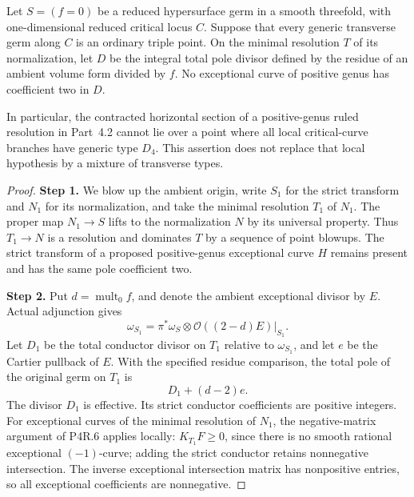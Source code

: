 \begin{proposition}[P4.39]
Let $S=(f=0)$ be a reduced hypersurface germ in a smooth
threefold, with one-dimensional reduced critical locus $C$.
Suppose that every generic transverse germ along $C$ is an
ordinary triple point. On the minimal resolution $T$ of its
normalization, let $D$ be the integral total pole divisor
defined by the residue of an ambient volume form divided by
$f$. No exceptional curve of positive genus has coefficient
two in $D$.

In particular, the contracted horizontal section of a
positive-genus ruled resolution in Part~4.2 cannot lie over
a point where all local critical-curve branches have generic
type $D_4$. This assertion does not replace that local
hypothesis by a mixture of transverse types.
\end{proposition}
\begin{proof}
\noindent\textbf{Step 1.} We blow up the ambient origin, write $S_1$ for the strict
transform and $N_1$ for its normalization, and take the
minimal resolution $T_1$ of $N_1$. The proper map $N_1\to S$
lifts to the normalization $N$ by its universal property.
Thus $T_1\to N$ is a resolution and dominates $T$ by a
sequence of point blowups. The strict transform of a proposed
positive-genus exceptional curve $H$ remains present and has
the same pole coefficient two.

\noindent\textbf{Step 2.} Put $d=\operatorname{mult}_0f$, and denote the ambient
exceptional divisor by $E$. Actual adjunction gives
\[
 \omega_{S_1}=\pi^*\omega_S\otimes
        \mathcal O((2-d)E)|_{S_1}.
\]
Let $D_1$ be the total conductor divisor on $T_1$ relative
to $\omega_{S_1}$, and let $e$ be the Cartier pullback of
$E$. With the specified residue comparison, the total pole
of the original germ on $T_1$ is
\[
                    D_1+(d-2)e.                       \tag{4.39a}
\]
The divisor $D_1$ is effective. Its strict conductor
coefficients are positive integers. For exceptional curves
of the minimal resolution of $N_1$, the negative-matrix
argument of P4R.6 applies locally: $K_{T_1}F\ge0$, since
there is no smooth rational exceptional $(-1)$-curve;
adding the strict conductor retains nonnegative intersection.
The inverse exceptional intersection matrix has nonpositive
entries, so all exceptional coefficients are nonnegative.


\end{proof}
